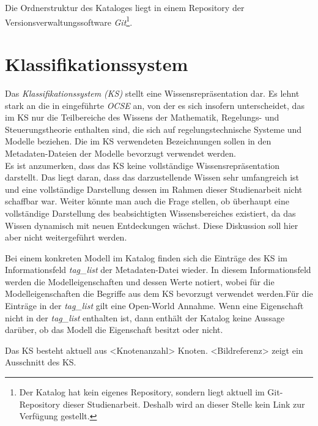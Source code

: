 Die Ordnerstruktur des Kataloges liegt in einem Repository der Versionsverwaltungssoftware \textit{Git}\footnote{Der Katalog hat kein eigenes Repository, sondern liegt aktuell im Git-Repository dieser Studienarbeit. Deshalb wird an dieser Stelle kein Link zur Verfügung gestellt.}.  %

\section{Klassifikationssystem}
\label{Ch:Ergebnisse:Sec:KS}
Das \textit{Klassifikationssystem (KS)} stellt eine Wissensrepräsentation dar. Es lehnt stark an die in \cite{KNHE20a} eingeführte \textit{OCSE} an, von der es sich insofern unterscheidet, das im KS nur die Teilbereiche des Wissens der Mathematik, Regelungs- und Steuerungstheorie enthalten sind, die sich auf regelungstechnische Systeme und Modelle beziehen. Die im KS verwendeten Bezeichnungen sollen in den Metadaten-Dateien der Modelle bevorzugt verwendet werden. \\
Es ist anzumerken, dass das KS keine vollständige Wissensrepräsentation darstellt. Das liegt daran, dass das darzustellende Wissen sehr umfangreich ist und eine vollständige Darstellung dessen im Rahmen dieser Studienarbeit nicht schaffbar war. Weiter könnte man auch die Frage stellen, ob überhaupt eine vollständige Darstellung des beabsichtigten Wissensbereiches existiert, da das Wissen dynamisch mit neuen Entdeckungen wächst. Diese Diskussion soll hier aber nicht weitergeführt werden. 

Bei einem konkreten Modell im Katalog finden sich die Einträge des KS im Informationsfeld \textit{tag\_list} der Metadaten-Datei wieder. In diesem Informationsfeld werden die Modelleigenschaften und dessen Werte notiert, wobei für die Modelleigenschaften die Begriffe aus dem KS bevorzugt verwendet werden.Für die Einträge in der \textit{tag\_list} gilt eine Open-World Annahme. Wenn eine Eigenschaft nicht in der \textit{tag\_list} enthalten ist, dann enthält der Katalog keine Aussage darüber, ob das Modell die Eigenschaft besitzt oder nicht.

Das KS besteht aktuell aus <Knotenanzahl> Knoten. <Bildreferenz> zeigt ein Ausschnitt des KS.
